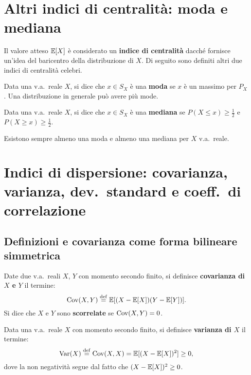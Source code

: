 \begin{multicols*}{2}
\section{Altri indici di centralità: moda e mediana}

Il valore atteso $\mathbb{E}[X]$ è considerato un \textbf{indice di centralità} dacché
fornisce un'idea del baricentro della distribuzione di $X$. Di seguito
sono definiti altri due indici di centralità celebri.

\begin{definition}[Moda]
    Data una v.a.~reale $X$, si dice che $x \in S_X$ è una \textbf{moda}
    se $x$ è un massimo per $P_X$. Una distribuzione in generale può avere
    più mode.
\end{definition}

\begin{definition}[Mediana]
    Data una v.a.~reale $X$, si dice che $x \in S_X$ è una \textbf{mediana}
    se $P(X \leq x) \geq \frac{1}{2}$ e $P(X \geq x) \geq \frac{1}{2}$.
\end{definition}

\begin{proposition}
    Esistono sempre almeno una moda e almeno una mediana
    per $X$ v.a.~reale.
\end{proposition}

\section{Indici di dispersione: covarianza, varianza, dev.~standard e coeff.~di correlazione}

\subsection{Definizioni e covarianza come forma bilineare simmetrica}

\begin{definition}
    Date due v.a.~reali $X$, $Y$ con momento secondo finito,
    si definisce \textbf{covarianza di $X$ e $Y$} il termine:
    \[
        \operatorname{Cov}(X, Y) \overset{\mathrm{def}}{=} \mathbb{E}[(X - \mathbb{E}[X])(Y - \mathbb{E}[Y])].
    \]
    Si dice che $X$ e $Y$ sono \textbf{scorrelate} se $\operatorname{Cov}(X, Y) = 0$.
\end{definition}

\begin{definition}[Varianza]
    Data una v.a.~reale $X$ con momento secondo finito, si
    definisce \textbf{varianza di $X$} il termine:
    \[
        \operatorname{Var}(X) \overset{\mathrm{def}}{=} \operatorname{Cov}(X, X) = \mathbb{E}[(X -\mathbb{E}[X])^2] \geq 0,
    \]
    dove la non negatività segue dal fatto che $(X - \mathbb{E}[X])^2 \geq 0$.
\end{definition}


\end{multicols*}
